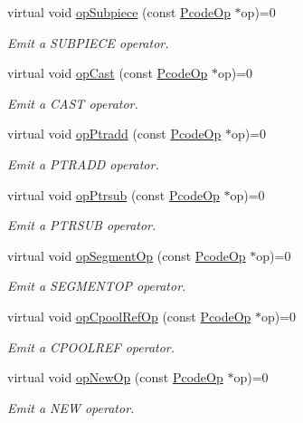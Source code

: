 \begin{DoxyCompactItemize}
virtual void \mbox{\hyperlink{class_print_language_a2ef0d6edea37fda486f27c341c319811}{op\+Subpiece}} (const \mbox{\hyperlink{class_pcode_op}{Pcode\+Op}} $\ast$op)=0
\begin{DoxyCompactList}\small\item\em Emit a S\+U\+B\+P\+I\+E\+CE operator. \end{DoxyCompactList}\item 
virtual void \mbox{\hyperlink{class_print_language_aa2797e634c8b55609b712fd96ea51385}{op\+Cast}} (const \mbox{\hyperlink{class_pcode_op}{Pcode\+Op}} $\ast$op)=0
\begin{DoxyCompactList}\small\item\em Emit a C\+A\+ST operator. \end{DoxyCompactList}\item 
virtual void \mbox{\hyperlink{class_print_language_a312cfe46529c9d64e84be1c39860ff6e}{op\+Ptradd}} (const \mbox{\hyperlink{class_pcode_op}{Pcode\+Op}} $\ast$op)=0
\begin{DoxyCompactList}\small\item\em Emit a P\+T\+R\+A\+DD operator. \end{DoxyCompactList}\item 
virtual void \mbox{\hyperlink{class_print_language_a9b0fca3c2bc867ff10572c0c42cb8c1e}{op\+Ptrsub}} (const \mbox{\hyperlink{class_pcode_op}{Pcode\+Op}} $\ast$op)=0
\begin{DoxyCompactList}\small\item\em Emit a P\+T\+R\+S\+UB operator. \end{DoxyCompactList}\item 
virtual void \mbox{\hyperlink{class_print_language_aec7fd98583552538d0d7c52e70512371}{op\+Segment\+Op}} (const \mbox{\hyperlink{class_pcode_op}{Pcode\+Op}} $\ast$op)=0
\begin{DoxyCompactList}\small\item\em Emit a S\+E\+G\+M\+E\+N\+T\+OP operator. \end{DoxyCompactList}\item 
virtual void \mbox{\hyperlink{class_print_language_a73b1e5b866866966de555918d3324684}{op\+Cpool\+Ref\+Op}} (const \mbox{\hyperlink{class_pcode_op}{Pcode\+Op}} $\ast$op)=0
\begin{DoxyCompactList}\small\item\em Emit a C\+P\+O\+O\+L\+R\+EF operator. \end{DoxyCompactList}\item 
virtual void \mbox{\hyperlink{class_print_language_a3974aa87aca2662a5fbe2e910ab763c7}{op\+New\+Op}} (const \mbox{\hyperlink{class_pcode_op}{Pcode\+Op}} $\ast$op)=0
\begin{DoxyCompactList}\small\item\em Emit a N\+EW operator. \end{DoxyCompactList}\end{DoxyCompactItemize}
